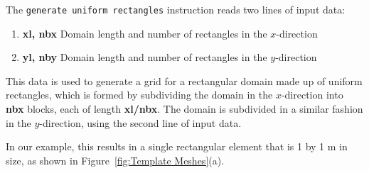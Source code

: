 The \texttt{generate uniform rectangles} instruction reads two lines of input data:
    \begin{enumerate}
        \item\textbf{xl, nbx}  Domain length and number of rectangles in the $x$-direction
        \item\textbf{yl, nby}  Domain length and number of rectangles in the $y$-direction
    \end{enumerate}
This data is used to generate a grid for a rectangular domain made up of uniform rectangles, which is
formed by subdividing the domain in the $x$-direction into \textbf{nbx} blocks, each of length \textbf{xl/nbx}.
The domain is subdivided in a similar fashion in the $y$-direction, using the second line of input data.

In our example, this results  in a single rectangular element that is 1 by 1 m in size, as shown in Figure~\ref{fig:Template Meshes}(a).






